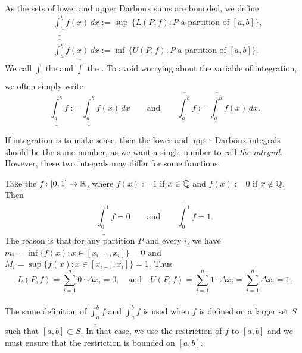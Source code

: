 \begin{defn}
As the sets of lower and upper Darboux sums are bounded, we define
\begin{align*}
& \underline{\int_a^b} f(x)\,dx :=
\sup \, \bigl\{ L(P,f) : P \text{ a partition of } [a,b] \bigr\} , \\
& \overline{\int_a^b} f(x)\,dx :=
\inf \, \bigl\{ U(P,f) : P \text{ a partition of } [a,b] \bigr\} .
\end{align*}
We call $\underline{\int}$
the \emph{} and
$\overline{\int}$ the
\emph{}.
To avoid worrying about the variable of integration, 
we often simply write
\begin{equation*}
\underline{\int_a^b} f :=
\underline{\int_a^b} f(x)\,dx 
\qquad \text{and} \qquad
\overline{\int_a^b} f :=
\overline{\int_a^b} f(x)\,dx  .
\end{equation*}
\end{defn}

If integration is to make sense, then the lower and upper Darboux
integrals should be the same number, as we want a single number to call
\emph{the integral}.  However, these two integrals may differ for
some functions.

\begin{example} \label{example:dirichletfunc}
Take the 
$f \colon [0,1] \to {\mathbb{R}}$, where $f(x) := 1$ if
$x \in {\mathbb{Q}}$ and $f(x) := 0$ if $x \notin {\mathbb{Q}}$.  Then
\begin{equation*}
\underline{\int_0^1} f = 0 \qquad \text{and} \qquad
\overline{\int_0^1} f = 1 .
\end{equation*}
The reason is that for any partition $P$ and every $i$, we have 
$m_i = \inf \bigl\{ f(x) : x \in [x_{i-1},x_i] \bigr\} = 0$  and
$M_i = \sup \bigl\{ f(x) : x \in [x_{i-1},x_i] \bigr\} = 1$.  Thus
\begin{equation*}
L(P,f) = \sum_{i=1}^n 0 \cdot \Delta x_i = 0 , \quad \text{and} \quad
U(P,f) = \sum_{i=1}^n 1 \cdot \Delta x_i = \sum_{i=1}^n \Delta x_i = 1  .
\end{equation*}
\end{example}

\begin{remark}
The same definition of $\underline{\int_a^b} f$ and
$\overline{\int_a^b} f$
is used when $f$ is defined on a larger set $S$ such that
$[a,b] \subset S$.  In that case, we use the restriction of $f$ to $[a,b]$
and we must ensure that the restriction is bounded on $[a,b]$.
\end{remark}

